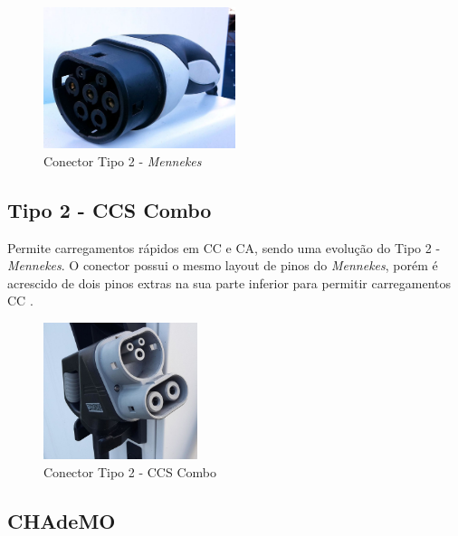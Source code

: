         \begin{figure}[H]
          \begin{center}
            \includegraphics[width=0.50\textwidth,natwidth=1024,natheight=755]{assets/images/connectors-mennekes.jpg}
            \caption{Conector Tipo 2 - \textit{Mennekes}}
            \label{fig:mennekes}
          \end{center}
        \end{figure}

      \subsection{Tipo 2 - CCS Combo}
      \label{stateofart:plugs:combo}

        Permite carregamentos rápidos em \ac{CC} e \ac{CA}, sendo uma evolução do Tipo 2 - \textit{Mennekes}. O conector possui o mesmo layout de pinos do \textit{Mennekes}, porém é acrescido de dois pinos extras na sua parte inferior para permitir carregamentos \ac{CC} \cite{ieee-review-evse}.

        \begin{figure}[H]
          \begin{center}
            \includegraphics[width=0.40\textwidth,natwidth=1024,natheight=973]{assets/images/connectors-combo.jpg}
            \caption{Conector Tipo 2 - CCS Combo}
            \label{fig:combo}
          \end{center}
        \end{figure}

      \subsection{CHAdeMO}
      \label{stateofart:plugs:chademo}

